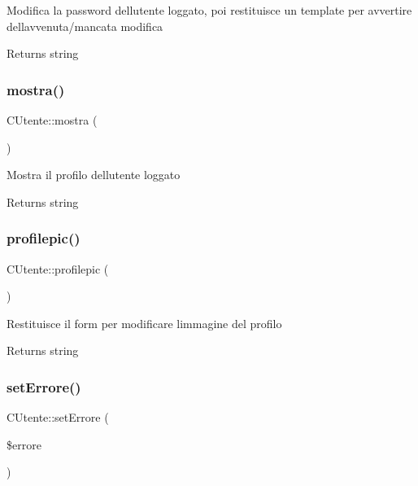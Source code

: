 Modifica la password dell\textquotesingle{}utente loggato, poi restituisce un template per avvertire dell\textquotesingle{}avvenuta/mancata modifica

\begin{DoxyReturn}{Returns}
string 
\end{DoxyReturn}
\mbox{\label{class_c_utente_a2138fc71f3c210935adf5014516f1c25}} 
\subsubsection{\texorpdfstring{mostra()}{mostra()}}
{\footnotesize\ttfamily C\+Utente\+::mostra (\begin{DoxyParamCaption}{ }\end{DoxyParamCaption})}

Mostra il profilo dell\textquotesingle{}utente loggato

\begin{DoxyReturn}{Returns}
string 
\end{DoxyReturn}
\mbox{\label{class_c_utente_a1d4de927464fda3e5bc51df989356843}} 
\subsubsection{\texorpdfstring{profilepic()}{profilepic()}}
{\footnotesize\ttfamily C\+Utente\+::profilepic (\begin{DoxyParamCaption}{ }\end{DoxyParamCaption})}

Restituisce il form per modificare l\textquotesingle{}immagine del profilo

\begin{DoxyReturn}{Returns}
string 
\end{DoxyReturn}
\mbox{\label{class_c_utente_a24aea1e55f730c87ebd735c737f91b9f}} 
\subsubsection{\texorpdfstring{set\+Errore()}{setErrore()}}
{\footnotesize\ttfamily C\+Utente\+::set\+Errore (\begin{DoxyParamCaption}\item[{}]{\$errore }\end{DoxyParamCaption})}


